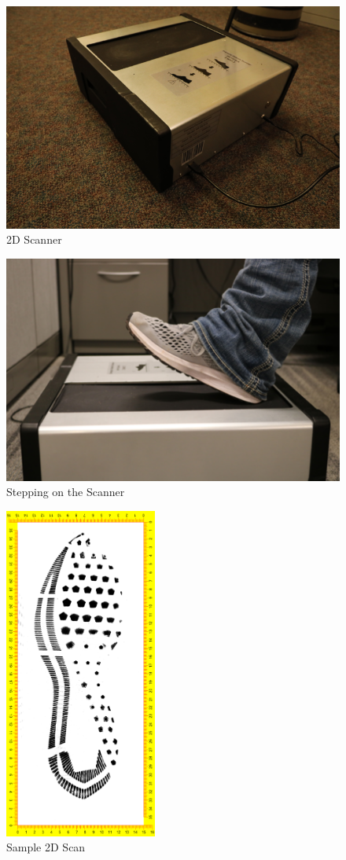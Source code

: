 \begin{figure}[!htp]
 \centering
 \includegraphics[width=12cm]{2D_Scanner}
 \caption{2D Scanner }
 \label{Image 7}
\end{figure}

\begin{figure}[!htp]
\centering
\includegraphics[width=12cm]{2D_Step_on}
\caption{Stepping on the Scanner}
\label{Image 8}
\end{figure}

\begin{figure}[!htp]
\centering
\includegraphics[width=5cm]{2D_1}
\caption{Sample 2D Scan}
\label{Image 9}
\end{figure}



